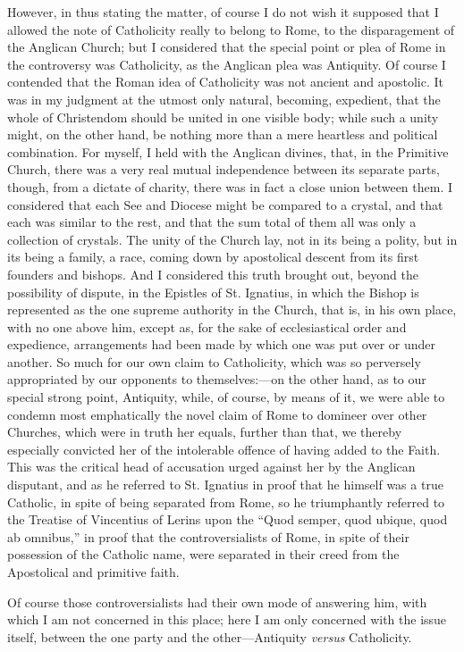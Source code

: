 However, in thus stating the matter, of course I do not wish it
supposed that I allowed the note of Catholicity really to
belong to Rome, to the disparagement of the Anglican Church; but I
considered that the special point or plea of Rome in the controversy
was Catholicity, as the Anglican plea was Antiquity. Of course I
contended that the Roman idea of Catholicity was not ancient and
apostolic. It was in my judgment at the utmost only natural, becoming,
expedient, that the whole of Christendom should be united in one visible
body; while such a unity might, on the other hand, be nothing more than a mere heartless and political combination.
For myself, I held with the Anglican divines, that, in the Primitive
Church, there was a very real mutual independence between its separate
parts, though, from a dictate of charity, there was in fact a close
union between them. I considered that each See and Diocese might be
compared to a crystal, and that each was similar to the rest, and that
the sum total of them all was only a collection of crystals. The unity
of the Church lay, not in its being a polity, but in its being a family,
a race, coming down by apostolical descent from its first founders and
bishops. And I considered this truth brought out, beyond the possibility
of dispute, in the Epistles of St. Ignatius, in which the Bishop is
represented as the one supreme authority in the Church, that is, in his
own place, with no one above him, except as, for the sake of
ecclesiastical order and expedience, arrangements had been made by which
one was put over or under another. So much for our own claim to
Catholicity, which was so perversely appropriated by our opponents to
themselves:—on the other hand, as to our special strong point,
Antiquity, while, of course, by means of it, we were able to condemn most
emphatically the novel claim of Rome to domineer over other Churches,
which were in truth her equals, further than that, we thereby especially
convicted her of the intolerable offence of having added to the Faith.
This was the critical head of accusation urged against her by the
Anglican disputant, and as he referred to St. Ignatius in proof that he
himself was a true Catholic, in spite of being separated from Rome, so
he triumphantly referred to the Treatise of Vincentius of Lerins upon
the ``Quod semper, quod ubique, quod ab omnibus,'' in proof that
the controversialists of Rome, in spite of their possession of the
Catholic name, were separated in their creed from the Apostolical
and primitive faith.

Of course those controversialists had their own mode of answering
him, with which I am not concerned in this place; here I am only
concerned with the issue itself, between the one party and the other—Antiquity \emph{versus} Catholicity.

